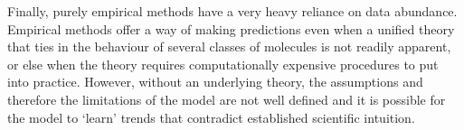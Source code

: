 Finally, purely empirical methods have a very heavy reliance on data abundance.
Empirical methods offer a way of making predictions even when a unified theory
that ties in the behaviour of several classes of molecules is not readily
apparent, or else when the theory requires computationally expensive procedures
to put into practice. However, without an underlying theory, the assumptions and
therefore the limitations of the model are not well defined and it is possible
for the model to `learn' trends that contradict established scientific
intuition.
